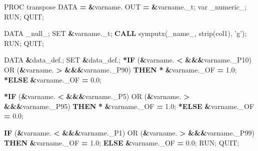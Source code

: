\documentclass[]{article}
\newenvironment{Shaded}{\begin{snugshade}}{\end{snugshade}}
\newcommand{\KeywordTok}[1]{\textcolor[rgb]{0.13,0.29,0.53}{\textbf{{#1}}}}
\newcommand{\DataTypeTok}[1]{\textcolor[rgb]{0.13,0.29,0.53}{{#1}}}
\newcommand{\FloatTok}[1]{\textcolor[rgb]{0.00,0.00,0.81}{{#1}}}
\newcommand{\StringTok}[1]{\textcolor[rgb]{0.31,0.60,0.02}{{#1}}}
\newcommand{\FunctionTok}[1]{\textcolor[rgb]{0.00,0.00,0.00}{{#1}}}
\newcommand{\NormalTok}[1]{{#1}}
\begin{document}
\begin{Shaded}
\begin{Highlighting}[]
{{{{{{{{{{{\NormalTok{%
    \NormalTok{PROC }\FunctionTok{transpose} \NormalTok{DATA }\KeywordTok{=} \KeywordTok{&}\NormalTok{varname. OUT }\KeywordTok{=} \KeywordTok{&}\NormalTok{varname._t;}
        \NormalTok{var _numeric_;}
    \NormalTok{RUN; QUIT;}
\NormalTok{%

\NormalTok{%
\DataTypeTok{    DATA} \NormalTok{_null_;}
        \NormalTok{SET }\KeywordTok{&}\NormalTok{varname._t;}
            \KeywordTok{CALL} \NormalTok{symputx(_name_, strip(col1), }\StringTok{'g'}\NormalTok{);}
    \NormalTok{RUN; QUIT;}
\NormalTok{%

\NormalTok{%
\DataTypeTok{    DATA} \KeywordTok{&}\NormalTok{data_def.;}
        \NormalTok{SET }\KeywordTok{&}\NormalTok{data_def.;}
            \KeywordTok{*IF} \NormalTok{(}\KeywordTok{&}\NormalTok{varname. }\KeywordTok{<} \KeywordTok{&&&}\NormalTok{varname._P10) OR (}\KeywordTok{&}\NormalTok{varname. }\KeywordTok{>} \KeywordTok{&&&}\NormalTok{varname._P90) }\KeywordTok{THEN}
            \KeywordTok{*}   \KeywordTok{&}\NormalTok{varname._OF }\KeywordTok{=} \FloatTok{1.0}\NormalTok{; }\KeywordTok{*ELSE} \KeywordTok{&}\NormalTok{varname._OF }\KeywordTok{=} \FloatTok{0.0}\NormalTok{;}
            
            \KeywordTok{*IF} \NormalTok{(}\KeywordTok{&}\NormalTok{varname. }\KeywordTok{<} \KeywordTok{&&&}\NormalTok{varname._P5) OR (}\KeywordTok{&}\NormalTok{varname. }\KeywordTok{>} \KeywordTok{&&&}\NormalTok{varname._P95) }\KeywordTok{THEN}
            \KeywordTok{*}   \KeywordTok{&}\NormalTok{varname._OF }\KeywordTok{=} \FloatTok{1.0}\NormalTok{; }\KeywordTok{*ELSE} \KeywordTok{&}\NormalTok{varname._OF }\KeywordTok{=} \FloatTok{0.0}\NormalTok{;}
            
            \KeywordTok{IF} \NormalTok{(}\KeywordTok{&}\NormalTok{varname. }\KeywordTok{<} \KeywordTok{&&&}\NormalTok{varname._P1) OR (}\KeywordTok{&}\NormalTok{varname. }\KeywordTok{>} \KeywordTok{&&&}\NormalTok{varname._P99) }\KeywordTok{THEN}
                \KeywordTok{&}\NormalTok{varname._OF }\KeywordTok{=} \FloatTok{1.0}\NormalTok{; }\KeywordTok{ELSE} \KeywordTok{&}\NormalTok{varname._OF }\KeywordTok{=} \FloatTok{0.0}\NormalTok{;}
    \NormalTok{RUN; QUIT;}
\NormalTok{%

}}}}}}}}}}}}}}}}}
\end{Highlighting}
\end{Shaded}
\end{document}
